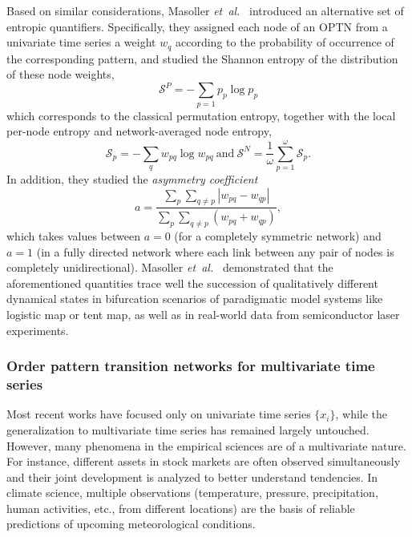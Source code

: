 Based on similar considerations, Masoller \emph{et~al.}~\cite{Masoller2015} introduced an alternative set of entropic quantifiers. Specifically, they assigned each node of an OPTN from a univariate time series a weight $w_q$ according to the probability of occurrence of the corresponding pattern, and studied the Shannon entropy of the distribution of these node weights,
\begin{equation}
\mathcal{S}^P=-\sum_{p=1} p_p \log p_p
\end{equation}
\noindent
which corresponds to the classical permutation entropy, together with the local per-node entropy and network-averaged node entropy,
\begin{equation}
\mathcal{S}_p=-\sum_{q} w_{pq}\log w_{pq} \ \mbox{and} \ \mathcal{S}^N = \frac{1}{\omega} \sum_{p=1}^\omega \mathcal{S}_p.
\end{equation}
\noindent
In addition, they studied the \emph{asymmetry coefficient}
\begin{equation}
a=\frac{\sum_p \sum_{q\neq p} \left| w_{pq}-w_{qp} \right|}{\sum_p \sum_{q\neq p} \left( w_{pq}+w_{qp} \right)},
\end{equation}
\noindent
which takes values between $a=0$ (for a completely symmetric network) and $a=1$ (in a fully directed network where each link between any pair of nodes is completely unidirectional). Masoller \emph{et~al.}~\cite{Masoller2015} demonstrated that the aforementioned quantities trace well the succession of qualitatively different dynamical states in bifurcation scenarios of paradigmatic model systems like logistic map or tent map, as well as in real-world data from semiconductor laser experiments.

        
		\subsubsection{Order pattern transition networks for multivariate time series}
		Most recent works have focused only on univariate time series $\{x_i\}$, while the generalization to multivariate time series has remained largely untouched. However, many phenomena in the empirical sciences are of a multivariate nature. For instance, different assets in stock markets are often observed simultaneously and their joint development is analyzed to better understand tendencies. In climate science, multiple observations (temperature, pressure, precipitation, human activities, etc., from different locations) are the basis of reliable predictions of upcoming meteorological conditions. 
		

